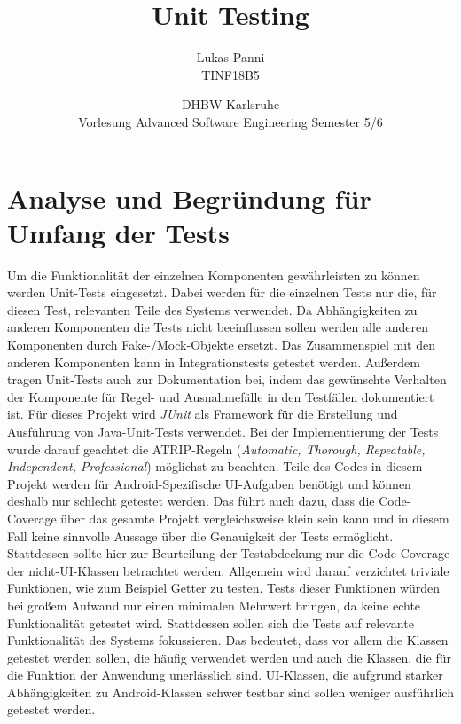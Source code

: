 \documentclass[12pt]{article}
\title{Unit Testing}
\date{DHBW Karlsruhe\\ Vorlesung Advanced Software Engineering Semester 5/6}
\author{Lukas Panni \\ TINF18B5}
\begin{document}
\maketitle

\newpage
\tableofcontents
\newpage


\section{Analyse und Begründung für Umfang der Tests}

Um die Funktionalität der einzelnen Komponenten gewährleisten zu können werden Unit-Tests eingesetzt.
Dabei werden für die einzelnen Tests nur die, für diesen Test, relevanten Teile des Systems verwendet.
Da Abhängigkeiten zu anderen Komponenten die Tests nicht beeinflussen sollen werden alle anderen Komponenten durch Fake-/Mock-Objekte ersetzt.
Das Zusammenspiel mit den anderen Komponenten kann in Integrationstests getestet werden.
Außerdem tragen Unit-Tests auch zur Dokumentation bei, indem das gewünschte Verhalten der Komponente für Regel- und Ausnahmefälle in den Testfällen dokumentiert ist.
\newline
Für dieses Projekt wird \textit{JUnit} als Framework für die Erstellung und Ausführung von Java-Unit-Tests verwendet.
Bei der Implementierung der Tests wurde darauf geachtet die ATRIP-Regeln (\textit{Automatic, Thorough, Repeatable, Independent, Professional}) möglichst zu beachten.
\newline
Teile des Codes in diesem Projekt werden für Android-Spezifische UI-Aufgaben benötigt und können deshalb nur schlecht getestet werden. Das führt auch dazu, dass die Code-Coverage über das gesamte Projekt vergleichsweise klein sein kann und in diesem Fall keine sinnvolle Aussage über die Genauigkeit der Tests ermöglicht.
Stattdessen sollte hier zur Beurteilung der Testabdeckung nur die Code-Coverage der nicht-UI-Klassen betrachtet werden.
\newline
Allgemein wird darauf verzichtet triviale Funktionen, wie zum Beispiel Getter zu testen.
Tests dieser Funktionen würden bei großem Aufwand nur einen minimalen Mehrwert bringen, da keine echte Funktionalität getestet wird.
Stattdessen sollen sich die Tests auf relevante Funktionalität des Systems fokussieren.
Das bedeutet, dass vor allem die Klassen getestet werden sollen, die häufig verwendet werden und auch die Klassen, die für die Funktion der Anwendung unerlässlich sind.
UI-Klassen, die aufgrund starker Abhängigkeiten zu Android-Klassen schwer testbar sind sollen weniger ausführlich getestet werden.
\end{document}
